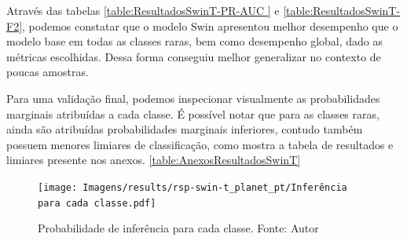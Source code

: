 Através das tabelas \ref{table:ResultadosSwinT-PR-AUC } e \ref{table:ResultadosSwinT-F2}, podemos constatar que o modelo Swin apresentou melhor desempenho que o modelo base em todas as classes raras, bem como desempenho global, dado as métricas escolhidas. Dessa forma conseguiu melhor generalizar no contexto de poucas amostras.

Para uma validação final, podemos inspecionar visualmente as probabilidades marginais atribuídas a cada classe. É possível notar que para as classes raras, ainda são atribuídas probabilidades marginais inferiores, contudo também possuem menores limiares de classificação, como mostra a tabela de resultados e limiares presente nos anexos. \ref{table:AnexosResultadosSwinT}

\begin{figure}[!ht]
    \centering
    \texttt{[image: Imagens/results/rsp-swin-t\_planet\_pt/Inferência para cada classe.pdf]}
    \caption{ Probabilidade de inferência para cada classe.
    Fonte: Autor}
    \label{fig:InferenciaClassesSwin}
\end{figure}  